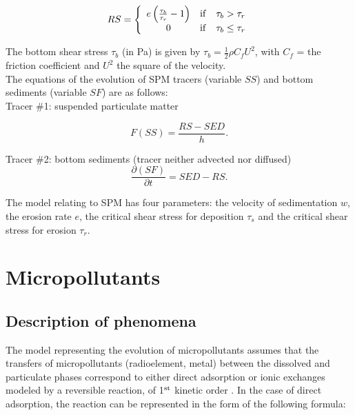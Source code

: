 \begin{equation}
  RS = \left\{
    \begin{array}{ccl}
      e \left( \frac{\tau_b}{\tau_r} -1 \right) & \rm{if} & \tau_b > \tau_r\\
      0 & \rm{if} & \tau_b \le \tau_r
    \end{array}
    \right .
\end{equation}


The bottom shear stress $\tau_b$ (in Pa) is given by $\tau_b = \frac{1}{2} \rho C_f U^2$,
with $C_f$ = the friction coefficient and $U^2$ the square of the velocity.\\

The equations of the evolution of SPM tracers (variable $SS$)
and bottom sediments (variable $SF$) are as follows:\\

Tracer $\#$1: suspended particulate matter

\begin{equation}
  F(SS) = \frac{RS-SED}{h}.
\end{equation}

Tracer $\#$2: bottom sediments (tracer neither advected nor diffused)\\

\begin{equation}
  \frac{\partial (SF)}{\partial t} = SED - RS.
\end{equation}

The model relating to SPM has four parameters: the velocity of sedimentation $w$,
the erosion rate $e$, the critical shear stress for deposition $\tau_s$
and the critical shear stress for erosion $\tau_r$.

\section{Micropollutants}

\subsection{Description of phenomena}

The model representing the evolution of micropollutants assumes
that the transfers of micropollutants (radioelement, metal)
between the dissolved and particulate phases correspond to either
direct adsorption or ionic exchanges modeled by a reversible reaction,
of 1$^{\rm{st}}$ kinetic order \cite{ciffroy_doubs_1995}.
In the case of direct adsorption, the reaction can be represented in the form of the following formula:\\

